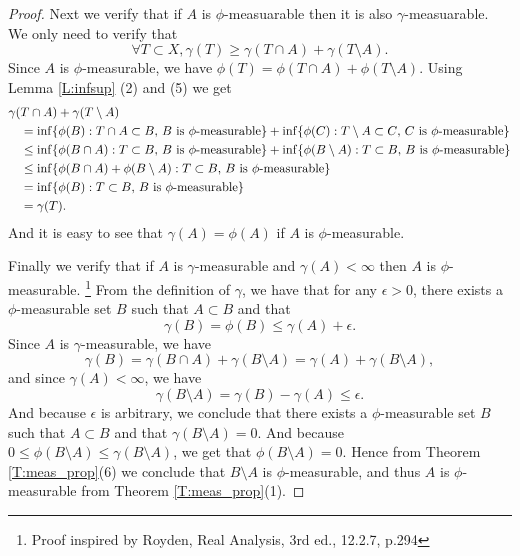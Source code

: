 \begin{proof}
Next we verify that if $A$ is $\phi$-measuarable then it is also
$\gamma$-measuarable. We only need to verify that 
\[
  \forall T\subset X, \gamma(T)\ge\gamma(T\cap A)+\gamma(T\setminus A).
\]
Since $A$ is $\phi$-measurable, we have 
$\phi(T)=\phi(T\cap A)+\phi(T\setminus A)$. Using Lemma \ref{L:infsup} (2) and
(5) we get
\begin{align*}
  \gamma(&T\cap A)+\gamma(T\setminus A) \notag \\
    &= \inf\{\phi(B): \text{$T\cap A\subset B$, $B$ is $\phi$-measurable} \}
     + \inf\{\phi(C):\text{$T\setminus A\subset C$, $C$ is $\phi$-measurable} \}
     \notag \\
    &\le \inf\{\phi(B\cap A): \text{$T\subset B$, $B$ is $\phi$-measurable} \}
    + \inf\{\phi(B\setminus A): \text{$T\subset B$, $B$ is $\phi$-measurable}\}
     \notag \\
    &\le \inf\{\phi(B\cap A)+\phi(B\setminus A): 
            \text{$T\subset B$, $B$ is $\phi$-measurable} \} \notag \\
    &= \inf\{\phi(B): \text{$T\subset B$, $B$ is $\phi$-measurable} \} \notag \\
    &= \gamma(T).
\end{align*}
And it is easy to see that $\gamma(A)=\phi(A)$ if $A$ is $\phi$-measurable.

Finally we verify that if $A$ is $\gamma$-measurable and $\gamma(A)<\infty$ then
$A$ is $\phi$-measurable.
\footnote{Proof inspired by Royden, Real Analysis, 3rd ed., 12.2.7, p.294}
From the definition of $\gamma$, we have that for any $\epsilon>0$, there exists
a $\phi$-measurable set $B$ such that $A\subset B$ and that
\[
  \gamma(B)=\phi(B)\le \gamma(A)+\epsilon.
\]
Since $A$ is $\gamma$-measurable, we have
\[
  \gamma(B)=\gamma(B\cap A) + \gamma(B\setminus A)
    = \gamma(A)+\gamma(B\setminus A),
\]
and since $\gamma(A)<\infty$, we have
\[
  \gamma(B\setminus A)=\gamma(B)-\gamma(A) \le \epsilon.
\]
And because $\epsilon$ is arbitrary, we conclude that there exists
a $\phi$-measurable set $B$ such that $A\subset B$ and that 
$\gamma(B\setminus A)=0$. And because 
$0\le\phi(B\setminus A)\le\gamma(B\setminus A)$, we get that
$\phi(B\setminus A)=0$. Hence from Theorem \ref{T:meas_prop}(6) we conclude 
that $B\setminus A$ is $\phi$-measurable, and 
thus $A$ is $\phi$-measurable from Theorem \ref{T:meas_prop}(1).
\end{proof}


